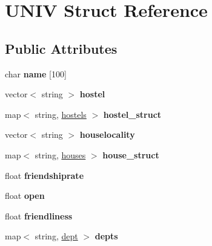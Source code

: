 \hypertarget{structUNIV}{\section{\-U\-N\-I\-V \-Struct \-Reference}
\label{structUNIV}
}
\subsection*{\-Public \-Attributes}
\begin{DoxyCompactItemize}
\item 
\hypertarget{structUNIV_a6715ccb99faf158f1d66d96305c8a8cc}{char {\bfseries name} \mbox{[}100\mbox{]}}\label{structUNIV_a6715ccb99faf158f1d66d96305c8a8cc}

\item 
\hypertarget{structUNIV_afd3b34911cd0e19316b21ce16497b20c}{vector$<$ string $>$ {\bfseries hostel}}\label{structUNIV_afd3b34911cd0e19316b21ce16497b20c}

\item 
\hypertarget{structUNIV_a899ba520b4f89ab205a7ca109e530c89}{map$<$ string, \hyperlink{structhostels}{hostels} $>$ {\bfseries hostel\-\_\-struct}}\label{structUNIV_a899ba520b4f89ab205a7ca109e530c89}

\item 
\hypertarget{structUNIV_afd1238ab003c282a83f4f50bc06278c6}{vector$<$ string $>$ {\bfseries houselocality}}\label{structUNIV_afd1238ab003c282a83f4f50bc06278c6}

\item 
\hypertarget{structUNIV_a992fd99c53f7f27c5f59bc1996fd57ea}{map$<$ string, \hyperlink{structhouses}{houses} $>$ {\bfseries house\-\_\-struct}}\label{structUNIV_a992fd99c53f7f27c5f59bc1996fd57ea}

\item 
\hypertarget{structUNIV_a2520a5e9883e33f910f911527ce63f3e}{float {\bfseries friendshiprate}}\label{structUNIV_a2520a5e9883e33f910f911527ce63f3e}

\item 
\hypertarget{structUNIV_aeec5dd4987d6efb9a3007f9cc507ccd6}{float {\bfseries open}}\label{structUNIV_aeec5dd4987d6efb9a3007f9cc507ccd6}

\item 
\hypertarget{structUNIV_ab4088856bba5057db662722b8f619a12}{float {\bfseries friendliness}}\label{structUNIV_ab4088856bba5057db662722b8f619a12}

\item 
\hypertarget{structUNIV_a8f343d7d6df965a1fe89e61433467671}{map$<$ string, \hyperlink{structdept}{dept} $>$ {\bfseries depts}}\label{structUNIV_a8f343d7d6df965a1fe89e61433467671}


\end{DoxyCompactItemize}
